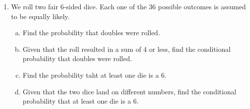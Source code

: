 \documentclass[11pt]{article}
\begin{document}
\begin{enumerate}
\item We roll two fair 6-sided dice. Each one of the 36 possible outcomes is
  assumed to be equally likely. 

\begin{enumerate}[(a)]
  \item Find the probability that doubles were rolled.
  \item Given that the roll resulted in a sum of 4 or less, find the conditional
    probability that doubles were rolled.
  \item Find the probability taht at least one die is a 6.
  \item Given that the two dice land on different numbers, find the conditional
    probability that at least one die is a 6.
\end{enumerate}

\end{enumerate}
\end{document}
